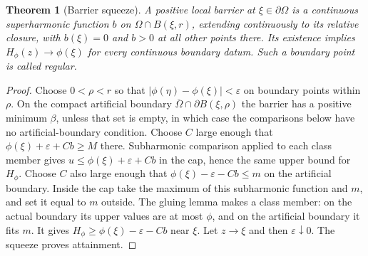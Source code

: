 \documentclass[11pt,a4paper,openany]{book}
\newtheorem{theorem}{Theorem}[chapter]
\theoremstyle{definition}
\theoremstyle{remark}\newtheorem{remark}[theorem]{Remark}
\newcommand{\eps}{\varepsilon}\newcommand{\ee}{\varepsilon}
\newcommand{\family}[1]{}
\begin{document}
\begin{theorem}[Barrier squeeze]\family{D12.14.04}\label{d12:14-04}
A positive local barrier at $\xi\in\partial\Omega$ is a continuous superharmonic function $b$ on $\Omega\cap B(\xi,r)$, extending continuously to its relative closure, with $b(\xi)=0$ and $b>0$ at all other points there. Its existence implies $H_\phi(z)\to\phi(\xi)$ for every continuous boundary datum. Such a boundary point is called regular.
\end{theorem}
\begin{proof}
Choose $0<\rho<r$ so that $|\phi(\eta)-\phi(\xi)|<\eps$ on boundary points within $\rho$. On the compact artificial boundary $\overline\Omega\cap\partial B(\xi,\rho)$ the barrier has a positive minimum $\beta$, unless that set is empty, in which case the comparisons below have no artificial-boundary condition. Choose $C$ large enough that $\phi(\xi)+\eps+Cb\ge M$ there. Subharmonic comparison applied to each class member gives $u\le\phi(\xi)+\eps+Cb$ in the cap, hence the same upper bound for $H_\phi$.
Choose $C$ also large enough that $\phi(\xi)-\eps-Cb\le m$ on the artificial boundary. Inside the cap take the maximum of this subharmonic function and $m$, and set it equal to $m$ outside. The gluing lemma makes a class member: on the actual boundary its upper values are at most $\phi$, and on the artificial boundary it fits $m$. It gives $H_\phi\ge\phi(\xi)-\eps-Cb$ near $\xi$. Let $z\to\xi$ and then $\eps\downarrow0$. The squeeze proves attainment.
\end{proof}
\end{document}

